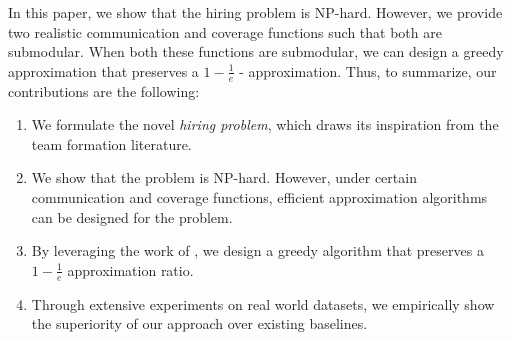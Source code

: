 In this paper, we show that the hiring problem is NP-hard.
However, we provide two realistic communication and coverage functions such that both are submodular.
When both these functions are submodular, we can design a greedy approximation \cite{bai2016algorithms} that preserves a $1 - \frac{1}{e}$ - approximation.
Thus, to summarize, our contributions are the following:

\begin{enumerate}
\item We formulate the novel \textit{hiring problem}, which draws its inspiration from the team formation literature.

\item We show that the problem is NP-hard. 
However, under certain communication and coverage functions, efficient approximation algorithms can be designed for the problem.

\item By leveraging the work of \cite{bai2016algorithms}, we design a greedy algorithm that preserves a $1 - \frac{1}{e}$ approximation ratio.

\item Through extensive experiments on real world datasets, we empirically show the superiority of our approach over existing baselines. 

\end{enumerate}